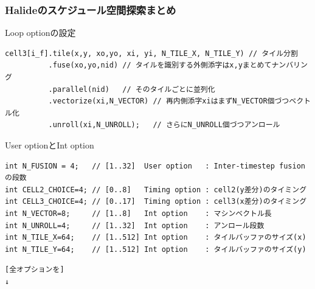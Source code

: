 \documentclass[dvipdfmx,cjk]{beamer}
\begin{document}
\begin{frame}[fragile]\frametitle{Halideのスケジュール空間探索まとめ}

Loop optionの設定

\begingroup \fontsize{8pt}{9pt}\selectfont
\begin{verbatim}
cell3[i_f].tile(x,y, xo,yo, xi, yi, N_TILE_X, N_TILE_Y) // タイル分割
          .fuse(xo,yo,nid) // タイルを識別する外側添字はx,yまとめてナンバリング
          .parallel(nid)   // そのタイルごとに並列化
          .vectorize(xi,N_VECTOR) // 再内側添字xiはまずN_VECTOR個づつベクトル化
          .unroll(xi,N_UNROLL);   // さらにN_UNROLL個づつアンロール
\end{verbatim}
\endgroup

User optionとInt option

\begingroup \fontsize{8pt}{9pt}\selectfont
\begin{verbatim}
int N_FUSION = 4;   // [1..32]  User option   : Inter-timestep fusionの段数
int CELL2_CHOICE=4; // [0..8]   Timing option : cell2(y差分)のタイミング
int CELL3_CHOICE=4; // [0..17]  Timing option : cell3(x差分)のタイミング
int N_VECTOR=8;     // [1..8]   Int option    : マシンベクトル長
int N_UNROLL=4;     // [1..32]  Int option    : アンロール段数
int N_TILE_X=64;    // [1..512] Int option    : タイルバッファのサイズ(x)
int N_TILE_Y=64;    // [1..512] Int option    : タイルバッファのサイズ(y)
\end{verbatim}
\endgroup

\begingroup \fontsize{8pt}{9pt}\selectfont
\begin{verbatim}
[全オプションを]
↓
\end{verbatim}
\endgroup
\end{frame}
\end{document}
